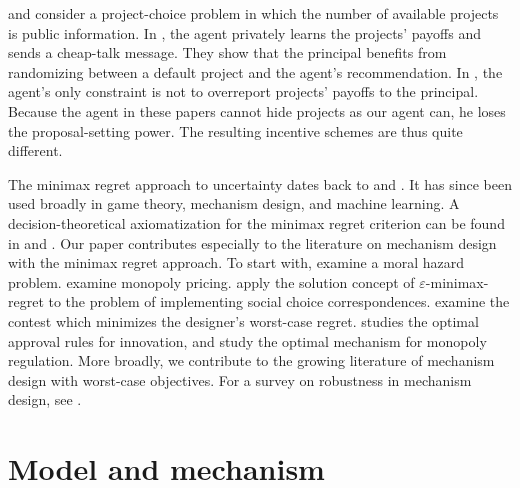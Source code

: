 \documentclass[12pt,english]{article}
\newcommand{\bfr}{\mathbf{R}}
\theoremstyle{remark}
\theoremstyle{plain}
\theoremstyle{definition}
\begin{document}
\cite{CheDesseinKartik2013} and \cite{GoelHannCaruthers} consider a project-choice problem in which the number of available projects is public information. In \cite{CheDesseinKartik2013}, the agent privately learns the projects' payoffs and sends a cheap-talk message. They show that the principal benefits from randomizing between a default project and the agent's recommendation. In \cite{GoelHannCaruthers}, the agent's only constraint is not to overreport projects' payoffs to the principal. Because the agent in these papers cannot hide projects as our agent can, he loses the proposal-setting power. The resulting incentive schemes are thus quite different.
 
The minimax regret approach to uncertainty dates back to \cite{Wald1950} and \cite{Savage1951}. It has since been used broadly in game theory, mechanism design, and machine learning. A decision-theoretical axiomatization for the minimax regret criterion can be found in \cite{milnor1954games} and \cite{Stoye2011}. Our paper contributes especially to the literature on mechanism design with the minimax regret approach. To start with, \cite{HurwiczShapiro1978} examine a moral hazard problem. \cite{BergemannSchlag2008, BergemannSchlag2011} examine monopoly pricing. \cite{RenouSchlag2011} apply the solution concept of $\varepsilon$-minimax-regret to the problem of implementing social choice correspondences. \cite{Bevia2019} examine the contest which minimizes the designer's worst-case regret. \cite{malladi2020judged} studies the optimal approval rules for innovation, and \cite{GuoShmaya2023} study the optimal mechanism for monopoly regulation. More broadly, we contribute to the growing literature of mechanism design with worst-case objectives. For a survey on robustness in mechanism design, see \cite{Carroll2019}. 


\section{Model and mechanism}
\end{document}

